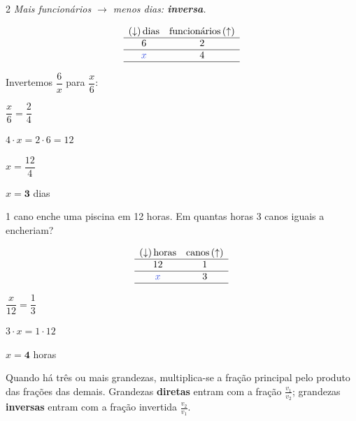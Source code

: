 \documentclass[12pt]{article}
\begin{document}
\begin{multicols}{2}
\textit{Mais funcionários $\rightarrow$ menos dias: \textbf{inversa}.}

$$\begin{array}{cc}
(\downarrow)\,\text{dias} & \text{funcionários}\,(\uparrow) \\ \hline
6 & 2 \\ \hline
\textcolor{iris}{x} & 4 \\ \hline
\end{array}$$

\vspace{0.2cm}

Invertemos $\dfrac{6}{x}$ para $\dfrac{x}{6}$:

\vspace{6px}
$\dfrac{x}{6} = \dfrac{2}{4}$ \vspace{6px}

$4 \cdot x = 2 \cdot 6 = 12$ \vspace{6px}

$x = \dfrac{12}{4}$ \vspace{6px}

$x = \textbf{3}$ dias


1 cano enche uma piscina em 12 horas. Em quantas horas 3 canos iguais a encheriam?

$$\begin{array}{cc}
(\downarrow)\,\text{horas} & \text{canos}\,(\uparrow) \\ \hline
12 & 1 \\ \hline
\textcolor{iris}{x} & 3 \\ \hline
\end{array}$$

\vspace{0.2cm}

$\dfrac{x}{12} = \dfrac{1}{3}$ \vspace{6px}

$3 \cdot x = 1 \cdot 12$ \vspace{6px}

$x = \textbf{4}$ horas


Quando há três ou mais grandezas, multiplica-se a fração principal pelo produto das frações das demais. Grandezas \textbf{diretas} entram com a fração $\frac{v_1}{v_2}$; grandezas \textbf{inversas} entram com a fração invertida $\frac{v_2}{v_1}$.



\end{multicols}
\end{document}
